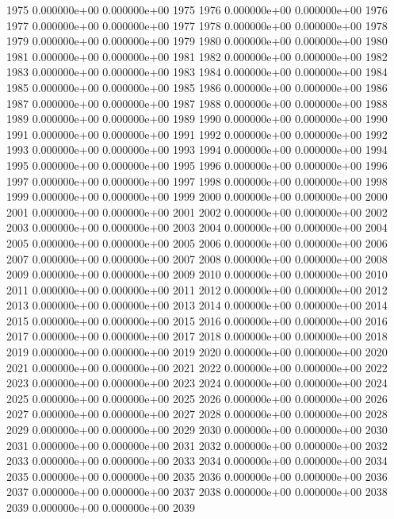 \documentclass{article}
\begin{document}
\begin{Schunk}
\begin{Soutput}
1975   0.000000e+00   0.000000e+00 1975
1976   0.000000e+00   0.000000e+00 1976
1977   0.000000e+00   0.000000e+00 1977
1978   0.000000e+00   0.000000e+00 1978
1979   0.000000e+00   0.000000e+00 1979
1980   0.000000e+00   0.000000e+00 1980
1981   0.000000e+00   0.000000e+00 1981
1982   0.000000e+00   0.000000e+00 1982
1983   0.000000e+00   0.000000e+00 1983
1984   0.000000e+00   0.000000e+00 1984
1985   0.000000e+00   0.000000e+00 1985
1986   0.000000e+00   0.000000e+00 1986
1987   0.000000e+00   0.000000e+00 1987
1988   0.000000e+00   0.000000e+00 1988
1989   0.000000e+00   0.000000e+00 1989
1990   0.000000e+00   0.000000e+00 1990
1991   0.000000e+00   0.000000e+00 1991
1992   0.000000e+00   0.000000e+00 1992
1993   0.000000e+00   0.000000e+00 1993
1994   0.000000e+00   0.000000e+00 1994
1995   0.000000e+00   0.000000e+00 1995
1996   0.000000e+00   0.000000e+00 1996
1997   0.000000e+00   0.000000e+00 1997
1998   0.000000e+00   0.000000e+00 1998
1999   0.000000e+00   0.000000e+00 1999
2000   0.000000e+00   0.000000e+00 2000
2001   0.000000e+00   0.000000e+00 2001
2002   0.000000e+00   0.000000e+00 2002
2003   0.000000e+00   0.000000e+00 2003
2004   0.000000e+00   0.000000e+00 2004
2005   0.000000e+00   0.000000e+00 2005
2006   0.000000e+00   0.000000e+00 2006
2007   0.000000e+00   0.000000e+00 2007
2008   0.000000e+00   0.000000e+00 2008
2009   0.000000e+00   0.000000e+00 2009
2010   0.000000e+00   0.000000e+00 2010
2011   0.000000e+00   0.000000e+00 2011
2012   0.000000e+00   0.000000e+00 2012
2013   0.000000e+00   0.000000e+00 2013
2014   0.000000e+00   0.000000e+00 2014
2015   0.000000e+00   0.000000e+00 2015
2016   0.000000e+00   0.000000e+00 2016
2017   0.000000e+00   0.000000e+00 2017
2018   0.000000e+00   0.000000e+00 2018
2019   0.000000e+00   0.000000e+00 2019
2020   0.000000e+00   0.000000e+00 2020
2021   0.000000e+00   0.000000e+00 2021
2022   0.000000e+00   0.000000e+00 2022
2023   0.000000e+00   0.000000e+00 2023
2024   0.000000e+00   0.000000e+00 2024
2025   0.000000e+00   0.000000e+00 2025
2026   0.000000e+00   0.000000e+00 2026
2027   0.000000e+00   0.000000e+00 2027
2028   0.000000e+00   0.000000e+00 2028
2029   0.000000e+00   0.000000e+00 2029
2030   0.000000e+00   0.000000e+00 2030
2031   0.000000e+00   0.000000e+00 2031
2032   0.000000e+00   0.000000e+00 2032
2033   0.000000e+00   0.000000e+00 2033
2034   0.000000e+00   0.000000e+00 2034
2035   0.000000e+00   0.000000e+00 2035
2036   0.000000e+00   0.000000e+00 2036
2037   0.000000e+00   0.000000e+00 2037
2038   0.000000e+00   0.000000e+00 2038
2039   0.000000e+00   0.000000e+00 2039

\end{Soutput}
\end{Schunk}
\end{document}
